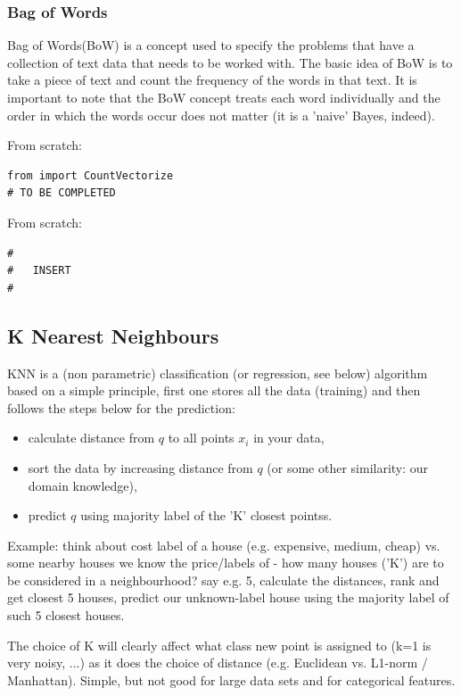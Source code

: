 \documentclass[11pt]{article}
\begin{document}
\subsubsection{Bag of Words}
 Bag of Words(BoW) is a concept used to specify the problems that have a collection of text data that needs to be worked with. The basic idea of BoW is to take a piece of text and count the frequency of the words in that text. It is important to note that the BoW concept treats each word individually and the order in which the words occur does not matter (it is a 'naive' Bayes, indeed).

From scratch:
\begin{lstlisting}
from import CountVectorize
# TO BE COMPLETED
\end{lstlisting}

From scratch:
\begin{lstlisting}
#
#	INSERT 
#
\end{lstlisting}

\subsection{K Nearest Neighbours} \label{K_Nearest_Neighbours} 
KNN is a (non parametric) classification (or regression, see below) algorithm based on a simple principle, first one stores all the data (training) and then follows the steps below for the prediction:
\begin{itemize}
	\item calculate distance from $q$ to all points $x_i$ in your data,
	\item sort the data by increasing distance from $q$ (or some other similarity: our domain knowledge),
	\item predict $q$ using majority label of the 'K' closest pointss.
\end{itemize}
Example: think about cost label of a house (e.g. expensive, medium, cheap) vs. some nearby houses we know the price/labels of - how many houses ('K') are to be considered in a neighbourhood? say e.g. 5, calculate the distances, rank and get closest 5 houses, predict our unknown-label house using the majority label of such 5 closest houses.  

The choice of K will clearly affect what class new point is assigned to (k=1 is very noisy, ...) as it does the choice of distance (e.g. Euclidean vs. L1-norm / Manhattan). Simple, but not good for large data sets and for categorical features.
\end{document}
